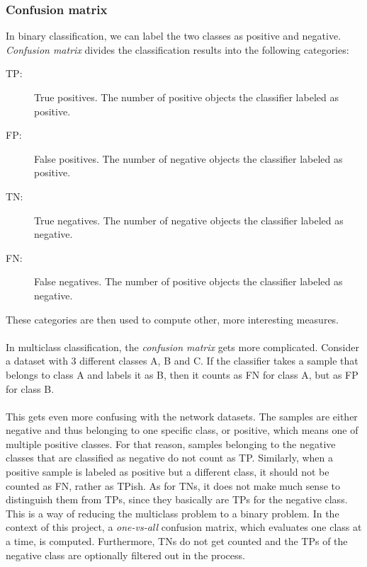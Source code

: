 \documentclass[11pt]{article}
\begin{document}
      \subsubsection{Confusion matrix}
        In binary classification, we can label the two classes as positive and negative. {\it Confusion matrix}\cite{confusion} divides the classification results into the following categories:
        \begin{description}
        \item [TP:]   True positives. The number of positive objects the classifier labeled as positive.
        \item [FP:]   False positives. The number of negative objects the classifier labeled as positive.
        \item [TN:]   True negatives. The number of negative objects the classifier labeled as negative.
        \item [FN:]   False negatives. The number of positive objects the classifier labeled as negative.
        \end{description}
        These categories are then used to compute other, more interesting measures.
        \\~\\
        In multiclass classification, the {\it confusion matrix} gets more complicated. Consider a dataset with 3 different classes A, B and C. If the classifier takes a sample that belongs to class A and labels it as B, then it counts as FN for class A, but as FP for class B.
        \\~\\
        This gets even more confusing with the network datasets. The samples are either negative and thus belonging to one specific class, or positive, which means one of multiple positive classes. For that reason, samples belonging to the negative classes that are classified as negative do not count as TP. Similarly, when a positive sample is labeled as positive but a different class, it should not be counted as FN, rather as TPish. As for TNs, it does not make much sense to distinguish them from TPs, since they basically are TPs for the negative class. This is a way of reducing the multiclass problem to a binary problem. In the context of this project, a {\it one-vs-all} confusion matrix, which evaluates one class at a time, is computed. Furthermore, TNs do not get counted and the TPs of the negative class are optionally filtered out in the process.
\end{document}

